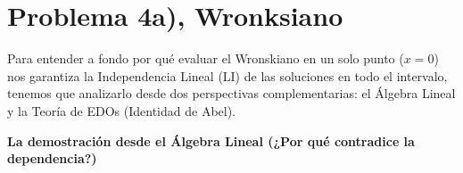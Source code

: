 \documentclass[11pt,spanish]{article}
\begin{document}
 
%
%

\appendix

\section{Problema 4a), Wronksiano}

Para entender a fondo por qué evaluar el Wronskiano en un solo punto ($x=0$) nos garantiza la Independencia Lineal (LI) de las soluciones en todo el intervalo, tenemos que analizarlo desde dos perspectivas complementarias: el Álgebra Lineal y la Teoría de EDOs (Identidad de Abel).

{\bf La demostración desde el Álgebra Lineal (¿Por qué contradice la dependencia?)}
\end{document}
